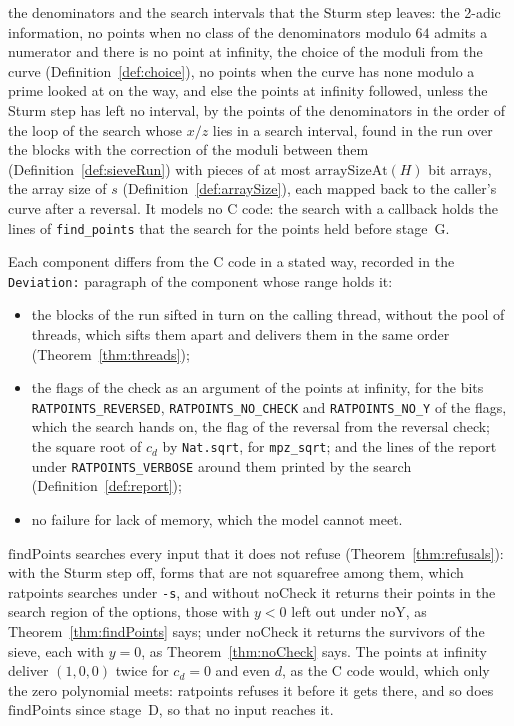 \begin{definition}
  the denominators and the search intervals that the Sturm step leaves: the 2-adic information, no
  points when no class of the denominators modulo $64$ admits a numerator and there is no point at
  infinity, the choice of the moduli from the curve (Definition~\ref{def:choice}), no points when
  the curve has none modulo a prime looked at on the way, and else the points at infinity followed,
  unless the Sturm step has left no interval, by the points of the denominators in the order of the
  loop of the search whose $x/z$ lies in a search interval, found in the run over the blocks with
  the correction of the moduli between them (Definition~\ref{def:sieveRun}) with pieces of at most
  $\mathrm{arraySizeAt}(H)$ bit arrays, the array size of $s$ (Definition~\ref{def:arraySize}), each
  mapped back to the caller's curve after a reversal. It models no C code: the search with a
  callback holds the lines of \verb|find_points| that the search for the points held before stage~G.
\end{definition}

Each component differs from the C code in a stated way, recorded in the \verb|Deviation:|
paragraph of the component whose range holds it:
\begin{itemize}
  \item the blocks of the run sifted in turn on the calling thread, without the pool of threads,
    which sifts them apart and delivers them in the same order (Theorem~\ref{thm:threads});
  \item the flags of the check as an argument of the points at infinity, for the bits
    \verb|RATPOINTS_REVERSED|, \verb|RATPOINTS_NO_CHECK| and \verb|RATPOINTS_NO_Y| of the flags,
    which the search hands on, the flag of the reversal from the reversal check; the square root of
    $c_d$ by \verb|Nat.sqrt|, for \verb|mpz_sqrt|; and the lines of the report under
    \verb|RATPOINTS_VERBOSE| around them printed by the search (Definition~\ref{def:report});
  \item no failure for lack of memory, which the model cannot meet.
\end{itemize}
$\mathrm{findPoints}$ searches every input that it does not refuse (Theorem~\ref{thm:refusals}):
with the Sturm step off, forms that are not squarefree among them, which ratpoints searches under
\verb|-s|, and without $\mathrm{noCheck}$ it returns their points in the search region of the
options, those with $y < 0$ left out under $\mathrm{noY}$, as Theorem~\ref{thm:findPoints} says;
under $\mathrm{noCheck}$ it returns the survivors of the sieve, each with $y = 0$, as
Theorem~\ref{thm:noCheck} says. The points at infinity deliver $(1, 0, 0)$ twice for $c_d = 0$ and
even $d$, as the C code would, which only the zero polynomial meets: ratpoints refuses it before it
gets there, and so does $\mathrm{findPoints}$ since stage~D, so that no input reaches it.

